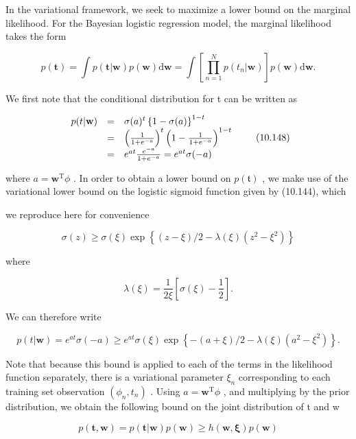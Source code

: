 \documentclass[
  10
]{article}
\begin{document}
In the variational framework, we seek to maximize a lower bound on the
marginal likelihood. For the Bayesian logistic regression model, the
marginal likelihood takes the form

\[
p (\mathbf {t}) = \int p (\mathbf {t} | \mathbf {w}) p (\mathbf {w}) \mathrm{d} \mathbf {w} = \int \left[ \prod_ {n = 1} ^ {N} p (t _ {n} | \mathbf {w}) \right] p (\mathbf {w}) \mathrm{d} \mathbf {w}.\tag{10.147}
\]

We first note that the conditional distribution for t can be written as

\[
\begin{array}{r c l} p (t | \mathbf {w}) & = & \sigma (a) ^ {t} \left\{1 - \sigma (a) \right\} ^ {1 - t} \\ & = & \left(\frac {1}{1 + e ^ {- a}}\right) ^ {t} \left(1 - \frac {1}{1 + e ^ {- a}}\right) ^ {1 - t} \\ & = & e ^ {a t} \frac {e ^ {- a}}{1 + e ^ {- a}} = e ^ {a t} \sigma (- a) \end{array}\tag{10.148}
\]

where \(a = \mathbf { w } ^ { \mathrm { T } } \phi\) . In order to
obtain a lower bound on \(p ( \mathfrak { t } )\) , we make use of the
variational lower bound on the logistic sigmoid function given by
(10.144), which

we reproduce here for convenience

\[
\sigma (z) \geqslant \sigma (\xi) \exp \left\{(z - \xi) / 2 - \lambda (\xi) (z ^ {2} - \xi^ {2}) \right\}\tag{10.149}
\]

where

\[
\lambda (\xi) = \frac {1}{2 \xi} \left[ \sigma (\xi) - \frac {1}{2} \right].\tag{10.150}
\]

We can therefore write

\[
p (t | \mathbf {w}) = e ^ {a t} \sigma (- a) \geqslant e ^ {a t} \sigma (\xi) \exp \left\{- (a + \xi) / 2 - \lambda (\xi) (a ^ {2} - \xi^ {2}) \right\}.\tag{10.151}
\]

Note that because this bound is applied to each of the terms in the
likelihood function separately, there is a variational parameter
\(\xi _ { n }\) corresponding to each training set observation
\(( \phi _ { n } , t _ { n } )\) . Using
\(a = \mathbf { w } ^ { \mathrm { T } } \phi\) , and multiplying by the
prior distribution, we obtain the following bound on the joint
distribution of t and w

\[
p (\mathbf {t}, \mathbf {w}) = p (\mathbf {t} | \mathbf {w}) p (\mathbf {w}) \geqslant h (\mathbf {w}, \boldsymbol {\xi}) p (\mathbf {w})\tag{10.152}
\]
\end{document}
